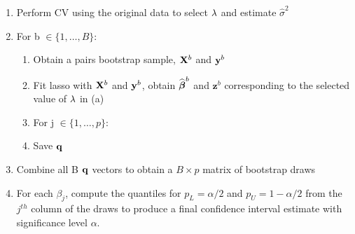 \begin{enumerate}
\item Perform CV using the original data to select $\lambda$ and estimate $\hat{\sigma}^2$
\item For b $\in \lbrace 1, \ldots, B \rbrace$:
\begin{enumerate}
\item Obtain a pairs bootstrap sample, $\mathbf{X}^b$ and $\mathbf{y}^b$
\item Fit lasso with $\mathbf{X}^b$ and $\mathbf{y}^b$, obtain $\widehat{\boldsymbol{\beta}}^b$ and $\boldsymbol{z}^b$ corresponding to the selected value of $\lambda$ in (a)
\item For j $\in \lbrace 1, \ldots, p \rbrace$:
	\begin{algorithmic}
    \EndCase
    \EndCase
    \EndCase
    \EndCase
	\EndSwitch 
	\end{algorithmic}
\item Save $\mathbf{q}$
\end{enumerate}
\item Combine all B $\mathbf{q}$ vectors to obtain a $B \times p$ matrix of bootstrap draws 
\item For each $\beta_j$, compute the quantiles for $p_L = \alpha/2$ and $p_U = 1 - \alpha/2$ from the $j^{th}$ column of the draws to produce a final confidence interval estimate with significance level $\alpha$.
\end{enumerate}

 

